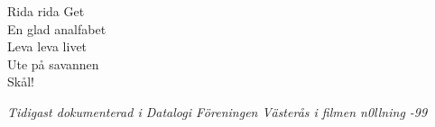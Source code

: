 \vspace{10pt}
Rida rida Get\\
En glad analfabet\\
Leva leva livet\\
Ute på savannen\\
Skål!\par
\vspace{10pt}
{\footnotesize\textit{Tidigast dokumenterad i Datalogi Föreningen Västerås i filmen n0llning -99}}
